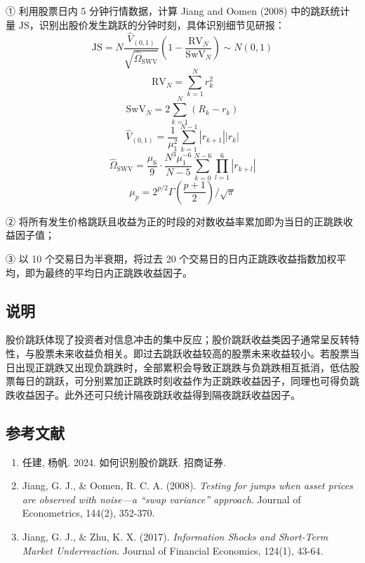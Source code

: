 \documentclass{article}
\begin{document}
① 利用股票日内 5 分钟行情数据，计算 Jiang and Oomen (2008) 中的跳跃统计量 \( \mathrm{JS} \)，识别出股价发生跳跃的分钟时刻，具体识别细节见研报：
\begin{equation}
    \mathrm{JS} = N \frac{\hat{V}_{(0,1)}}{\sqrt{\hat{\Omega}_{\mathrm{SWV}}}} \left( 1 - \frac{\mathrm{RV}_N}{\mathrm{SwV}_N} \right) \sim N(0,1)
\end{equation}
\begin{equation}
    \mathrm{RV}_N = \sum_{k=1}^{N} r_k^2
\end{equation}
\begin{equation}
    \mathrm{SwV}_N = 2 \sum_{k=1}^{N} (R_k - r_k)
\end{equation}
\begin{equation}
    \hat{V}_{(0,1)} = \frac{1}{\mu_1^2} \sum_{k=1}^{N-1} |r_{k+1}| |r_k|
\end{equation}
\begin{equation}
    \hat{\Omega}_{\mathrm{SWV}} = \frac{\mu_6}{9} \cdot \frac{N^3 \mu_1^{-6}}{N - 5} \sum_{k=0}^{N-6} \prod_{l=1}^{6} |r_{k+l}|
\end{equation}
\begin{equation}
    \mu_p = 2^{p/2} \Gamma \left( \frac{p+1}{2} \right) / \sqrt{\pi}
\end{equation}

② 将所有发生价格跳跃且收益为正的时段的对数收益率累加即为当日的正跳跌收益因子值；

③ 以 10 个交易日为半衰期，将过去 20 个交易日的日内正跳跌收益指数加权平均，即为最终的平均日内正跳跌收益因子。

\subsection{说明}
股价跳跃体现了投资者对信息冲击的集中反应；股价跳跃收益类因子通常呈反转特性，与股票未来收益负相关。即过去跳跃收益较高的股票未来收益较小。若股票当日出现正跳跌又出现负跳跌时，全部累积会导致正跳跌与负跳跌相互抵消，低估股票每日的跳跃，可分别累加正跳跌时刻收益作为正跳跌收益因子，同理也可得负跳跌收益因子。此外还可只统计隔夜跳跃收益得到隔夜跳跃收益因子。

\subsection{参考文献}
\begin{enumerate}
    \item 任建, 杨帆. 2024. 如何识别股价跳跃. 招商证券.
    \item Jiang, G. J., \& Oomen, R. C. A. (2008). \textit{Testing for jumps when asset prices are observed with noise—a “swap variance” approach}. Journal of Econometrics, 144(2), 352-370.
    \item Jiang, G. J., \& Zhu, K. X. (2017). \textit{Information Shocks and Short-Term Market Underreaction}. Journal of Financial Economics, 124(1), 43-64.
\end{enumerate}
\end{document}

